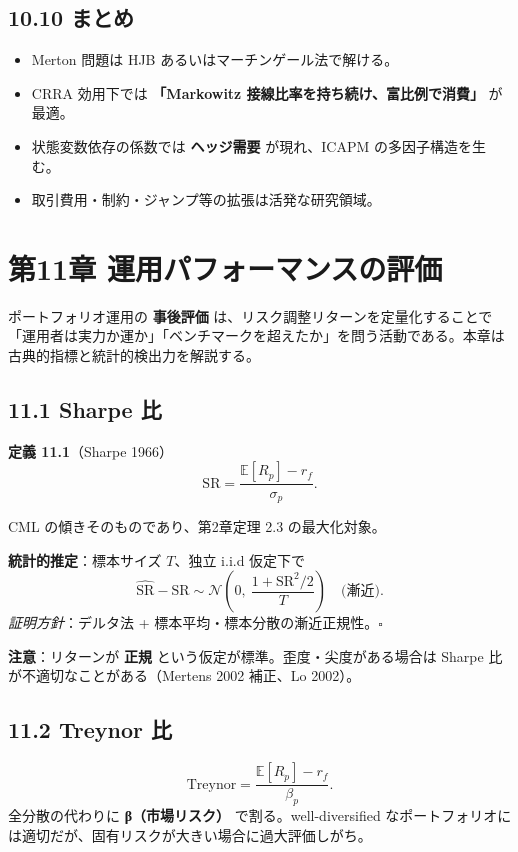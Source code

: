 \documentclass[11pt,a4paper]{report}
\begin{document}
\section{10.10 まとめ}

\begin{itemize}
\item Merton 問題は HJB あるいはマーチンゲール法で解ける。
\item CRRA 効用下では \textbf{「Markowitz 接線比率を持ち続け、富比例で消費」} が最適。
\item 状態変数依存の係数では \textbf{ヘッジ需要} が現れ、ICAPM の多因子構造を生む。
\item 取引費用・制約・ジャンプ等の拡張は活発な研究領域。
\end{itemize}

\noindent\hrulefill

\chapter{第11章 運用パフォーマンスの評価}

ポートフォリオ運用の \textbf{事後評価} は、リスク調整リターンを定量化することで「運用者は実力か運か」「ベンチマークを超えたか」を問う活動である。本章は古典的指標と統計的検出力を解説する。

\section{11.1 Sharpe 比}

\textbf{定義 11.1}（Sharpe 1966） \[ \mathrm{SR} = \frac{\mathbb{E}[R_p] - r_f}{\sigma_p}. \]

CML の傾きそのものであり、第2章定理 2.3 の最大化対象。

\textbf{統計的推定}：標本サイズ $T$、独立 i.i.d 仮定下で \[ \hat{\mathrm{SR}} - \mathrm{SR} \sim \mathcal{N}\left(0,\ \frac{1 + \mathrm{SR}^2/2}{T}\right) \quad \text{(漸近)}. \] \emph{証明方針}：デルタ法 + 標本平均・標本分散の漸近正規性。$\square$

\textbf{注意}：リターンが \textbf{正規} という仮定が標準。歪度・尖度がある場合は Sharpe 比が不適切なことがある（Mertens 2002 補正、Lo 2002）。

\section{11.2 Treynor 比}

\[ \mathrm{Treynor} = \frac{\mathbb{E}[R_p] - r_f}{\beta_p}. \] 全分散の代わりに \textbf{β（市場リスク）} で割る。well-diversified なポートフォリオには適切だが、固有リスクが大きい場合に過大評価しがち。
\end{document}
